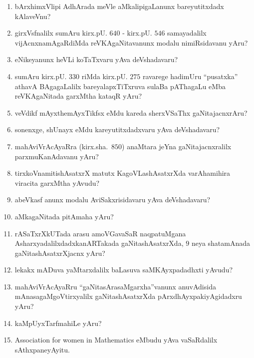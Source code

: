 \begin{enumerate}
\item bArxhimxVlipi AdhArada meVle aMkalipigaLanunx bareyutitxdadx kAlaveVnu? 
  
\item girxVsfnalilx sumAru kirx.pU. $640$ - kirx.pU. $546$ samayadalilx vijAcnxna\-mAgaRdiMda reVKAgaNitavanunx modalu nimiRsidavanu yAru?
  
\item eNikeyanunx heVLi koTaTxvaru yAva deVshadavaru?

\item sumAru kirx.pU. $330$ riMda kirx.pU. $275$ ravarege hadimUru ``pusatxka'' athavA BAgagaLalilx bareyalapxTiTxruva sulaBa pAThagaLu eMba reVKAgaNitada garxMtha kataqR yAru?
  
\item veVdikf mAyxthemAyxTikfsx eMdu kareda sherxVSaThx gaNitajacnxrAru?
  
\item sonenxge, shUnayx eMdu kareyutitxdadxvaru yAva deVshadavaru?
  
\item mahAviVrAcAyaRra (kirx.sha.~$850$) anaMtara jeYna gaNitajacnxralilx parxmuKa\-nAdavanu yAru?
  
\item tirxkoVnamitishAsatxrX matutx KagoVLashAsatxrXda varAhamihira viracita garxMtha yAvudu?
  
\item abeVkasf anunx modalu AviSakxrisidavaru yAva deVshadavaru?
  
\item aMkagaNitada pitAmaha yAru?

\item rASaTxrXkUTada arasu amoVGavaSaR naqpatuMgana Asharxyadalilxdadx\break kanARTakada gaNitashAsatxrXda, $9$ neya shatamAnada gaNitashAsatxrXjacnx yAru?

\item lekakx mADuva yaMtarxdalilx baLasuva saMKAyxpadadhxti yAvudu?
  
\item mahAviVrAcAyaRru ``gaNitasArasaMgarxha''vanunx anuvAdisida mAnasa\-gaMgoVtirxyalilx gaNitashAsatxrXda pArxdhAyxpakiyAgidadxru yAru? 
  
\item kaMpUyxTarfmahiLe yAru?
  
\item {\rm Association for women in Mathematics} eMbudu yAva vaSaRdalilx sAthxpaneyAyitu.
  

\end{enumerate}
